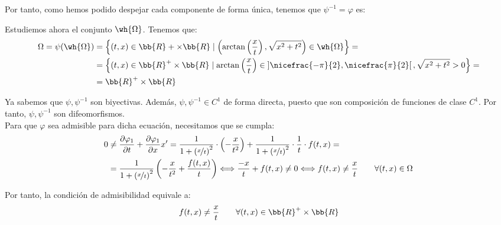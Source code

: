 \documentclass[12pt]{article}
\begin{document}
\begin{ejercicio}
    Por tanto, como hemos podido despejar cada componente de forma única, tenemos que $\psi^{-1}=\varphi$ es:

    Estudiemos ahora el conjunto $\wh{\Omega}$. Tenemos que:
    \begin{align*}
        \Omega = \psi(\wh{\Omega}) &= \left\{(t, x)\in\bb{R}+\times \bb{R} \mid \left(\arctan \left(\dfrac{x}{t}\right), \sqrt{x^2+t^2}\right)\in \wh{\Omega}\right\}
        =\\&= \left\{(t, x)\in\bb{R}^+\times \bb{R} \mid \arctan \left(\dfrac{x}{t}\right)\in\left]\nicefrac{-\pi}{2}, \nicefrac{\pi}{2}\right[, \sqrt{x^2+t^2}>0\right\}
        =\\&= \bb{R}^+\times \bb{R}
    \end{align*}

    Ya sabemos que $\psi, \psi^{-1}$ son biyectivas. Además, $\psi,\psi^{-1} \in C^1$ de forma directa, puesto que son composición de funciones de clase $C^1$. Por tanto, $\psi,\psi^{-1}$ son difeomorfismos.\\

    Para que $\varphi$ sea admisible para dicha ecuación, necesitamos que se cumpla:
    \begin{align*}
        0&\neq \dfrac{\partial \varphi_1}{\partial t} + \dfrac{\partial \varphi_1}{\partial x} x'
        = \dfrac{1}{1+\left(\nicefrac{x}{t}\right)^2}\cdot \left(-\dfrac{x}{t^2}\right) + \dfrac{1}{1+\left(\nicefrac{x}{t}\right)^2}\cdot \dfrac{1}{t}\cdot f(t, x)
        =\\&= \dfrac{1}{1+\left(\nicefrac{x}{t}\right)^2}\left(-\dfrac{x}{t^2} + \dfrac{f(t, x)}{t}\right)
        \Longleftrightarrow
        \dfrac{-x}{t}+f(t, x)\neq 0
        \Longleftrightarrow
        f(t, x)\neq \dfrac{x}{t} \qquad \forall (t, x)\in \Omega
    \end{align*}

    Por tanto, la condición de admisibilidad equivale a:
    \begin{equation*}
        f(t, x)\neq \dfrac{x}{t} \qquad \forall (t, x)\in \bb{R}^+\times \bb{R}
    \end{equation*}
\end{ejercicio}

    
\end{document}
